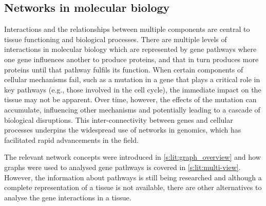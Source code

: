 \subsection{Networks in molecular biology} \label{s:lit:nets_bio}

\vspace{3mm}
\vspace{3mm}

Interactions and the relationships between multiple components are central to tissue functioning and biological processes. There are multiple levels of interactions in molecular biology which are represented by gene pathways where one gene influences another to produce proteins, and that in turn produces more proteins until that pathway fulfils its function. When certain components of cellular mechanisms fail, such as a mutation in a gene that plays a critical role in key pathways (e.g., those involved in the cell cycle), the immediate impact on the tissue may not be apparent. Over time, however, the effects of the mutation can accumulate, influencing other mechanisms and potentially leading to a cascade of biological disruptions. This inter-connectivity between genes and cellular processes underpins the widespread use of networks in genomics, which has facilitated rapid advancements in the field.

The relevant network concepts were introduced in \cref{s:lit:graph_overview}
and how graphs were used to analysed gene pathways is covered in \cref{s:lit:multi-view}. However, the information about pathways is still being researched and although a complete representation of a tissue is not available, there are other alternatives to analyse the gene interactions in a tissue.

